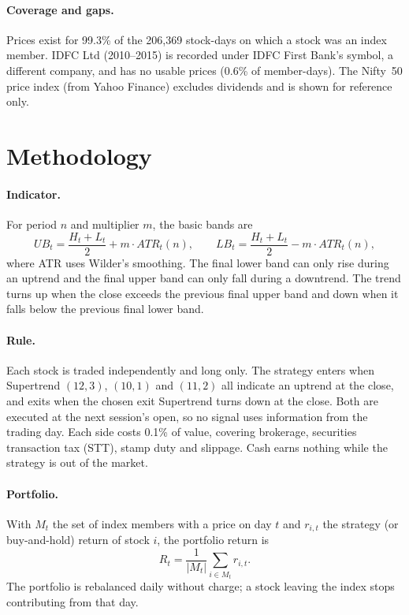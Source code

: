 \documentclass[11pt]{article}
\begin{document}
\paragraph{Coverage and gaps.} Prices exist for 99.3\% of the 206,369 stock-days on which a stock was an index
member. IDFC Ltd (2010--2015) is recorded under IDFC First Bank's symbol, a different company, and has no usable
prices (0.6\% of member-days). The Nifty~50 price index (from Yahoo Finance) excludes dividends and is shown for
reference only.

\section{Methodology}

\paragraph{Indicator.} For period $n$ and multiplier $m$, the basic bands are
\begin{equation}
UB_t = \frac{H_t + L_t}{2} + m \cdot ATR_t(n), \qquad LB_t = \frac{H_t + L_t}{2} - m \cdot ATR_t(n),
\end{equation}
where ATR uses Wilder's smoothing. The final lower band can only rise during an uptrend and the final upper band
can only fall during a downtrend. The trend turns up when the close exceeds the previous final upper band and
down when it falls below the previous final lower band.

\paragraph{Rule.} Each stock is traded independently and long only. The strategy enters when Supertrend
$(12, 3)$, $(10, 1)$ and $(11, 2)$ all indicate an uptrend at the close, and exits when the chosen exit
Supertrend turns down at the close. Both are executed at the next session's open, so no signal uses information
from the trading day. Each side costs 0.1\% of value, covering brokerage, securities transaction tax (STT), stamp
duty and slippage. Cash earns nothing while the strategy is out of the market.

\paragraph{Portfolio.} With $M_t$ the set of index members with a price on day $t$ and $r_{i,t}$ the strategy
(or buy-and-hold) return of stock $i$, the portfolio return is
\begin{equation}
R_t = \frac{1}{|M_t|} \sum_{i \in M_t} r_{i,t}.
\end{equation}
The portfolio is rebalanced daily without charge; a stock leaving the index stops contributing from that day.
\end{document}
